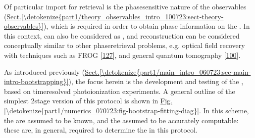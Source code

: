 \documentclass[letterpaper,table,10pt,english]{jupyterBook}
\begin{document}
\sphinxAtStartPar
Of particular import for {\hyperref[\detokenize{backmatter/glossary:term-radial-matrix-elements}]{}} retrieval is the phase\sphinxhyphen{}sensitive nature of the observables (\hyperref[\detokenize{part1/theory_observables_intro_100723:sect-theory-observables}]{Sect.\@ \ref{\detokenize{part1/theory_observables_intro_100723:sect-theory-observables}}}), which is required in order to obtain phase information on the {\hyperref[\detokenize{backmatter/glossary:term-partial-waves}]{}}. In this context, {\hyperref[\detokenize{backmatter/glossary:term-PADs}]{}} can also be considered as , and reconstruction can be considered conceptually similar to other phase\sphinxhyphen{}retrieval problems, e.g. optical field recovery with techniques such as FROG {[}\hyperlink{cite.backmatter/bibliography:id927}{127}{]}, and general quantum tomography {[}\hyperlink{cite.backmatter/bibliography:id781}{100}{]}.

\sphinxAtStartPar
As introduced previously (\hyperref[\detokenize{part1/main_intro_060723:sec-main-intro-bootstrapping}]{Sect.\@ \ref{\detokenize{part1/main_intro_060723:sec-main-intro-bootstrapping}}}), the focus herein is the development and testing of the , based on time\sphinxhyphen{}resolved {\hyperref[\detokenize{backmatter/glossary:term-RWP}]{}} photoionization experiments. A general outline of the simplest 2\sphinxhyphen{}stage version of this protocol is shown in \hyperref[\detokenize{part1/numerics_070723:fig-bootstrap-fitting-diag}]{Fig.\@ \ref{\detokenize{part1/numerics_070723:fig-bootstrap-fitting-diag}}}. In this scheme, the {\hyperref[\detokenize{backmatter/glossary:term-channel-functions}]{}} are assumed to be known, and the {\hyperref[\detokenize{backmatter/glossary:term-ADMs}]{}} assumed to be accurately computable: these are, in general, required to determine the {\hyperref[\detokenize{backmatter/glossary:term-radial-matrix-elements}]{}} in this protocol.
\end{document}
